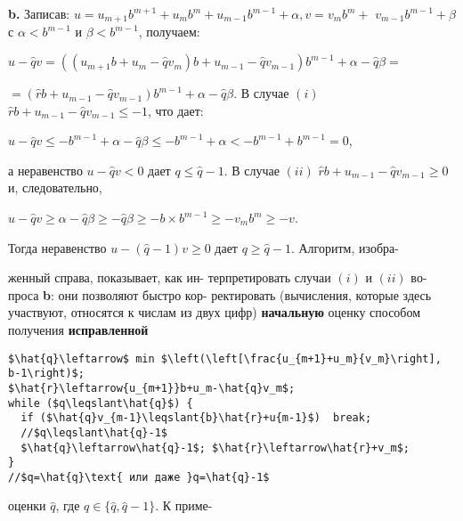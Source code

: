 \documentclass{/home/pkmixer/mai_practice/git_rep/mai_prac_2017/template/mai_book}
\begin{document}
\textbf{b.} Записав: $u=u_{m+1}b^{m+1}+u_mb^m+u_{m-1}b^{m-1}+\alpha, v=v_mb^m+$\linebreak
$v_{m-1}b^{m-1}+\beta$ с $\alpha<b^{m-1}$ и $\beta<b^{m-1}$, получаем:
\begin{center}
$u-\hat{q}v=((u_{m+1}b+u_m-\hat{q}v_m)b+u_{m-1}-\hat{q}v_{m-1})b^{m-1}+\alpha-\hat{q}\beta=$
\end{center}
\hspace*{80pt}$=(\hat{r}b+u_{m-1}-\hat{q}v_{m-1})b^{m-1}+\alpha-\hat{q}\beta$.\newline
В случае $(i)$ $\hat{r}b+u_{m-1}-\hat{q}v_{m-1}\leqslant-1$, что дает:
\begin{center}
$u-\hat{q}v\leqslant-b^{m-1}+\alpha-\hat{q}\beta\leqslant-b^{m-1}+\alpha<-b^{m-1}+b^{m-1}=0$,
\end{center}
а неравенство $u-\hat{q}v<0$ дает $q\leqslant\hat{q}-1$. В случае $(ii)$ $\hat{r}b+u_{m-1}-\hat{q}v_{m-1}\geqslant{0}$\linebreak
и, следовательно,
\begin{center}
$u-\hat{q}v\geqslant\alpha-\hat{q}\beta\geqslant-\hat{q}\beta\geqslant-b\times{b^{m-1}}\geqslant-v_mb^m\geqslant-v$.
\end{center}
Тогда неравенство $u-(\hat{q}-1)v\geqslant0$ дает $q\geqslant\hat{q}-1$. Алгоритм, изобра-\linebreak
\begin{multicols}{2}
\noindent
женный справа, показывает, как ин-\linebreak
терпретировать случаи $(i)$ и $(ii)$ во-\linebreak
проса \textbf{b}: они позволяют быстро кор-\linebreak
ректировать (вычисления, которые\linebreak
здесь участвуют, относятся к числам
из двух цифр) \textbf{начальную} оценку
способом получения \textbf{исправленной}\linebreak
\columnbreak
\begin{lstlisting}[mathescape=true, frame=l]
$\hat{q}\leftarrow$ min $\left(\left[\frac{u_{m+1}+u_m}{v_m}\right], b-1\right)$;
$\hat{r}\leftarrow{u_{m+1}}b+u_m-\hat{q}v_m$;
while ($q\leqslant\hat{q}$) {
  if ($\hat{q}v_{m-1}\leqslant{b}\hat{r}+u{m-1}$)  break;
  //$q\leqslant\hat{q}-1$
  $\hat{q}\leftarrow\hat{q}-1$; $\hat{r}\leftarrow\hat{r}+v_m$;
}
//$q=\hat{q}\text{ или даже }q=\hat{q}-1$
\end{lstlisting}
\end{multicols}
\noindent
оценки $\hat{q}$, где $q\in\{\hat{q},\hat{q}-1\}$. К приме-\linebreak
\end{document}
